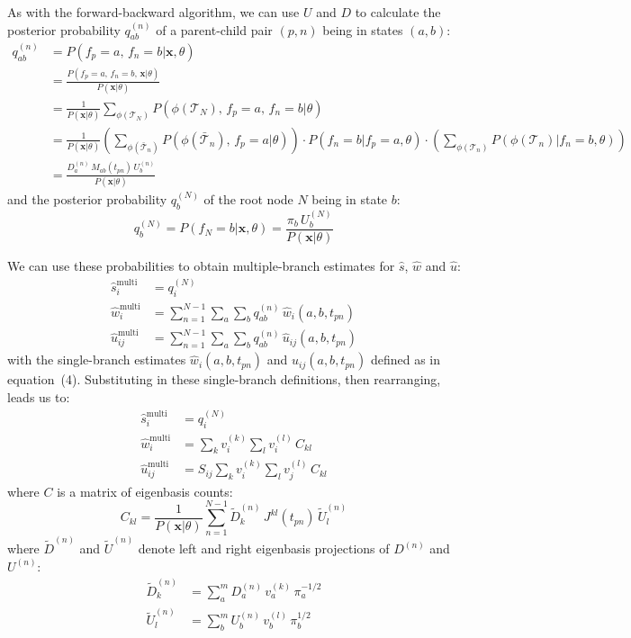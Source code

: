 \documentclass[12pt]{article}
\begin{document}
As with the forward-backward algorithm, we can use $U$ and $D$ to calculate the posterior probability
$q^{(n)}_{ab}$ of a parent-child pair $(p, n)$ being in states $(a, b)$:
\begin{align*}
q^{(n)}_{ab} &= P(f_p = a,\, f_n = b | \mathbf{x}, \theta) \\
&= \frac{P(f_p = a,\, f_n = b,\, \mathbf{x} | \theta)}{P(\mathbf{x} | \theta)} \\
&= \frac{1}{P(\mathbf{x} | \theta)} \sum_{\phi(\mathcal{T}_N)} P(\phi(\mathcal{T}_N),\, f_p = a,\, f_n = b | \theta) \\
&= \frac{1}{P(\mathbf{x} | \theta)} \left(\sum_{\phi(\bar{\mathcal{T}}_n)} P(\phi(\bar{\mathcal{T}}_n),\, f_p = a | \theta)\right) \cdot P(f_n = b | f_p = a, \theta) \cdot \left(\sum_{\phi(\mathcal{T}_n)} P(\phi(\mathcal{T}_n) | f_n = b, \theta)\right) \\
&= \frac{D^{(n)}_a\, M_{ab}(t_{pn})\, U^{(n)}_b}{P(\mathbf{x} | \theta)}
\end{align*}
and the posterior probability $q^{(N)}_b$ of the root node $N$ being in state $b$:
\[
q^{(N)}_b = P(f_N = b | \mathbf{x}, \theta) = \frac{\pi_b\, U^{(N)}_b}{P(\mathbf{x} | \theta)}
\]

We can use these probabilities to obtain multiple-branch estimates for $\hat{s}$, $\hat{w}$ and
$\hat{u}$:
\begin{align*}
\hat{s}^{\text{multi}}_i &= q^{(N)}_i \\
\hat{w}^{\text{multi}}_i &= \sum_{n=1}^{N-1} \sum_a \sum_b q^{(n)}_{ab}\, \hat{w}_i(a, b, t_{pn}) \\
\hat{u}^{\text{multi}}_{ij} &= \sum_{n=1}^{N-1} \sum_a \sum_b q^{(n)}_{ab}\, \hat{u}_{ij}(a, b, t_{pn})
\end{align*}
with the single-branch estimates $\hat{w}_i(a, b, t_{pn})$ and $\hat{u}_{ij}(a, b, t_{pn})$ defined
as in equation~(4). Substituting in these single-branch definitions, then rearranging, leads us to:
\begin{equation}
\begin{aligned}
\hat{s}^{\text{multi}}_i &= q^{(N)}_i \\
\hat{w}^{\text{multi}}_i &= \sum_k v_i^{(k)} \sum_l v_i^{(l)}\, C_{kl} \\
\hat{u}^{\text{multi}}_{ij} &= S_{ij} \sum_k v_i^{(k)} \sum_l v_j^{(l)}\, C_{kl}
\end{aligned}
\end{equation}
where $C$ is a matrix of eigenbasis counts:
\begin{equation}
C_{kl} = \frac{1}{P(\mathbf{x} | \theta)} \sum_{n=1}^{N-1} \tilde{D}^{(n)}_k\, J^{kl}(t_{pn})\, \tilde{U}^{(n)}_l
\end{equation}
where $\tilde{D}^{(n)}$ and $\tilde{U}^{(n)}$ denote left and right eigenbasis projections of
$D^{(n)}$ and $U^{(n)}$:
\begin{equation}
\begin{aligned}
\tilde{D}^{(n)}_k &= \sum_a^m D^{(n)}_a\, v_a^{(k)}\, \pi_a^{-1/2} \\[4pt]
\tilde{U}^{(n)}_l &= \sum_b^m U^{(n)}_b\, v_b^{(l)}\, \pi_b^{1/2}
\end{aligned}
\end{equation}
\end{document}
